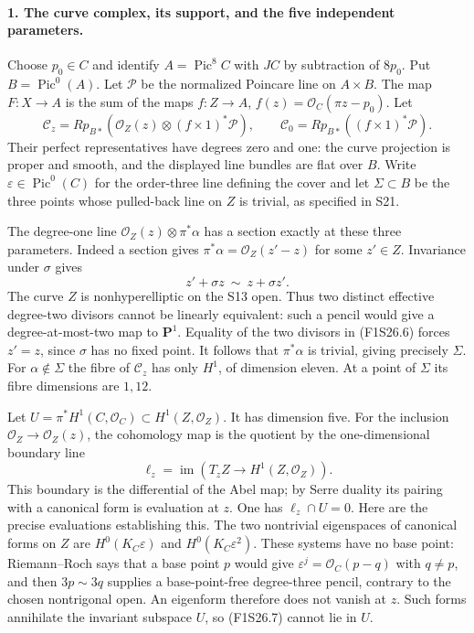 \paragraph{1. The curve complex, its support, and the five independent parameters.}
Choose $p_0\in C$ and identify $A=\operatorname{Pic}^8C$ with
$JC$ by subtraction of $8p_0$. Put $B=\operatorname{Pic}^0(A)$.
Let $\mathcal P$ be the normalized Poincare line on $A\times B$.
The map $F:X\to A$ is the sum of the maps
$f:Z\to A$, $f(z)=\mathcal O_C(\pi z-p_0)$.
Let
\[
 \mathcal C_z=Rp_{B*}
  (\mathcal O_Z(z)\otimes(f\times1)^*\mathcal P),\qquad
 \mathcal C_0=Rp_{B*}((f\times1)^*\mathcal P).
 \tag{F1S26.5}
\]
Their perfect representatives have degrees zero and one:
the curve projection is proper and smooth, and the displayed
line bundles are flat over $B$.
Write $\varepsilon\in\operatorname{Pic}^0(C)$ for the order-three
line defining the cover and let
$\Sigma\subset B$ be the three points whose pulled-back line
on $Z$ is trivial, as specified in S21.

The degree-one line
$\mathcal O_Z(z)\otimes\pi^*\alpha$ has a section exactly at
these three parameters. Indeed a section gives
$\pi^*\alpha=\mathcal O_Z(z'-z)$ for some $z'\in Z$.
Invariance under $\sigma$ gives
\[
                         z'+\sigma z\ \sim\ z+\sigma z'.
 \tag{F1S26.6}
\]
The curve $Z$ is nonhyperelliptic on the S13 open. Thus two
distinct effective degree-two divisors cannot be linearly
equivalent: such a pencil would give a degree-at-most-two map
to $\mathbf P^1$. Equality of the two divisors in (F1S26.6)
forces $z'=z$, since $\sigma$ has no fixed point. It follows
that $\pi^*\alpha$ is trivial, giving precisely $\Sigma$.
For $\alpha\notin\Sigma$ the fibre of $\mathcal C_z$ has only
$H^1$, of dimension eleven. At a point of $\Sigma$ its fibre
dimensions are $1,12$.

Let $U=\pi^*H^1(C,\mathcal O_C)\subset H^1(Z,\mathcal O_Z)$.
It has dimension five. For the inclusion
$\mathcal O_Z\to\mathcal O_Z(z)$, the cohomology map is the
quotient by the one-dimensional boundary line
\[
 \ell_z=\operatorname{im}\left(T_zZ\longrightarrow
                                    H^1(Z,\mathcal O_Z)\right).
 \tag{F1S26.7}
\]
This boundary is the differential of the Abel map; by Serre
duality its pairing with a canonical form is evaluation at $z$.
One has $\ell_z\cap U=0$. Here are the precise evaluations
establishing this. The two nontrivial eigenspaces of canonical
forms on $Z$ are $H^0(K_C\varepsilon)$ and
$H^0(K_C\varepsilon^2)$. These systems have no base point:
Riemann--Roch says that a base point $p$ would give
$\varepsilon^j=\mathcal O_C(p-q)$ with $q\ne p$, and then
$3p\sim3q$ supplies a base-point-free degree-three pencil,
contrary to the chosen nontrigonal open. An eigenform therefore
does not vanish at $z$. Such forms annihilate the invariant
subspace $U$, so (F1S26.7) cannot lie in $U$.


